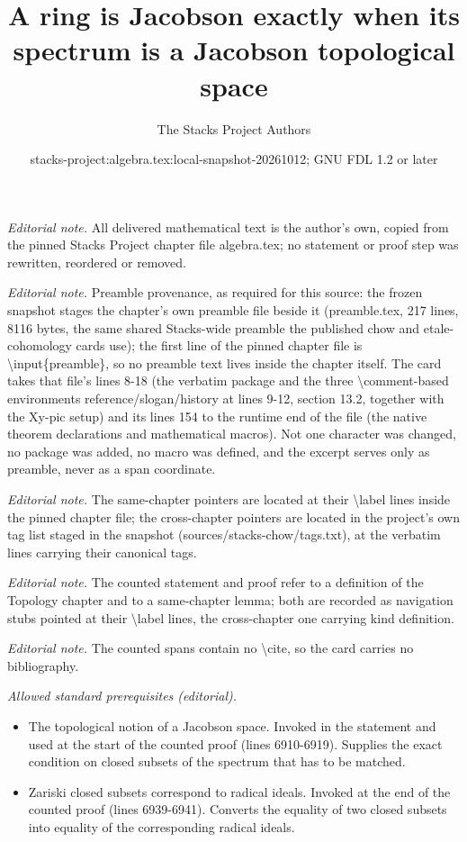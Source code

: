 \documentclass[10pt,a4paper]{amsart}
\title{A ring is Jacobson exactly when its spectrum is a Jacobson topological space}
\author{The Stacks Project Authors}
\date{stacks-project:algebra.tex:local-snapshot-20261012; GNU FDL 1.2 or later}
\theoremstyle{plain}
\theoremstyle{definition}
\theoremstyle{remark}
\numberwithin{equation}{subsection}
\begin{document}
\maketitle
\noindent\textit{Editorial note.} All delivered mathematical text is the author's own, copied from the pinned Stacks Project chapter file algebra.tex; no statement or proof step was rewritten, reordered or removed.\par\medskip
\noindent\textit{Editorial note.} Preamble provenance, as required for this source: the frozen snapshot stages the chapter's own preamble file beside it (preamble.tex, 217 lines, 8116 bytes, the same shared Stacks-wide preamble the published chow and etale-cohomology cards use); the first line of the pinned chapter file is \textbackslash{}input\{preamble\}, so no preamble text lives inside the chapter itself. The card takes that file's lines 8-18 (the verbatim package and the three \textbackslash{}comment-based environments reference/slogan/history at lines 9-12, section 13.2, together with the Xy-pic setup) and its lines 154 to the runtime end of the file (the native theorem declarations and mathematical macros). Not one character was changed, no package was added, no macro was defined, and the excerpt serves only as preamble, never as a span coordinate.\par\medskip
\noindent\textit{Editorial note.} The same-chapter pointers are located at their \textbackslash{}label lines inside the pinned chapter file; the cross-chapter pointers are located in the project's own tag list staged in the snapshot (sources/stacks-chow/tags.txt), at the verbatim lines carrying their canonical tags.\par\medskip
\noindent\textit{Editorial note.} The counted statement and proof refer to a definition of the Topology chapter and to a same-chapter lemma; both are recorded as navigation stubs pointed at their \textbackslash{}label lines, the cross-chapter one carrying kind definition.\par\medskip
\noindent\textit{Editorial note.} The counted spans contain no \textbackslash{}cite, so the card carries no bibliography.\par\medskip
\noindent\textit{Allowed standard prerequisites (editorial).}\begin{itemize}
\item The topological notion of a Jacobson space. Invoked in the statement and used at the start of the counted proof (lines 6910-6919). Supplies the exact condition on closed subsets of the spectrum that has to be matched.
\item Zariski closed subsets correspond to radical ideals. Invoked at the end of the counted proof (lines 6939-6941). Converts the equality of two closed subsets into equality of the corresponding radical ideals.
\end{itemize}\medskip
\end{document}
